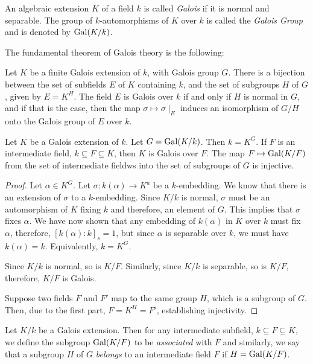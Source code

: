 \begin{definition}
    An algebraic extension $K$ of a field $k$ is called \textit{Galois} if it is normal and separable. The group of $k$-automorphisms of $K$ over $k$ is called the \textit{Galois Group} and is denoted by $\operatorname{Gal}(K/k)$.
\end{definition}

The fundamental theorem of Galois theory is the following: 
\begin{theorem}[FTGT]
    Let $K$ be a finite Galois extension of $k$, with Galois group $G$. There is a bijection between the set of subfields $E$ of $K$ containing $k$, and the set of subgroups $H$ of $G$, given by $E = K^H$. The field $E$ is Galois over $k$ if and only if $H$ is normal in $G$, and if that is the case, then the map $\sigma\mapsto\sigma\mid_E$ induces an isomorphism of $G/H$ onto the Galois group of $E$ over $k$.
\end{theorem}

\begin{theorem}
    Let $K$ be a Galois extension of $k$. Let $G = \operatorname{Gal}(K/k)$. Then $k = K^G$. If $F$ is an intermediate field, $k\subseteq F\subseteq K$, then $K$ is Galois over $F$. The map $F\mapsto\operatorname{Gal}(K/F)$ from the set of intermediate fieldws into the set of subgroups of $G$ is injective.
\end{theorem}
\begin{proof}
    Let $\alpha\in K^G$. Let $\sigma: k(\alpha)\to K^a$ be a $k$-embedding. We know that there is an extension of $\sigma$ to a $k$-embedding. Since $K/k$ is normal, $\sigma$ must be an automorphism of $K$ fixing $k$ and therefore, an element of $G$. This implies that $\sigma$ fixes $\alpha$. We have now shown that any embedding of $k(\alpha)$ in $K$ over $k$ must fix $\alpha$, therefore, $[k(\alpha):k]_s = 1$, but since $\alpha$ is separable over $k$, we must have $k(\alpha) = k$. Equivalently, $k = K^G$.


    Since $K/k$ is normal, so is $K/F$. Similarly, since $K/k$ is separable, so is $K/F$, therefore, $K/F$ is Galois.

    Suppose two fields $F$ and $F'$ map to the same group $H$, which is a subgroup of $G$. Then, due to the first part, $F = K^H = F'$, establishing injectivity.
\end{proof}

\begin{definition}
    Let $K/k$ be a Galois extension. Then for any intermediate subfield, $k\subseteq F\subseteq K$, we define the subgroup $\operatorname{Gal}(K/F)$ to be \textit{associated} with $F$ and similarly, we say that a subgroup $H$ of $G$ \textit{belongs} to an intermediate field $F$ if $H = \operatorname{Gal}(K/F)$.
\end{definition}

